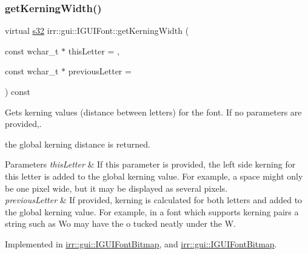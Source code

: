 \subsubsection{\texorpdfstring{get\+Kerning\+Width()}{getKerningWidth()}\hspace{0.1cm}{\footnotesize\ttfamily [1/2]}}
{\footnotesize\ttfamily virtual \hyperlink{namespaceirr_ac66849b7a6ed16e30ebede579f9b47c6}{s32} irr\+::gui\+::\+I\+G\+U\+I\+Font\+::get\+Kerning\+Width (\begin{DoxyParamCaption}\item[{const wchar\+\_\+t $\ast$}]{this\+Letter = {},  }\item[{const wchar\+\_\+t $\ast$}]{previous\+Letter = {} }\end{DoxyParamCaption}) const\hspace{0.3cm}{\ttfamily [pure virtual]}}



Gets kerning values (distance between letters) for the font. If no parameters are provided,. 

the global kerning distance is returned. 
\begin{DoxyParams}{Parameters}
{\em this\+Letter} & If this parameter is provided, the left side kerning for this letter is added to the global kerning value. For example, a space might only be one pixel wide, but it may be displayed as several pixels. \\
\hline
{\em previous\+Letter} & If provided, kerning is calculated for both letters and added to the global kerning value. For example, in a font which supports kerning pairs a string such as \textquotesingle{}Wo\textquotesingle{} may have the \textquotesingle{}o\textquotesingle{} tucked neatly under the \textquotesingle{}W\textquotesingle{}. \\
\hline
\end{DoxyParams}


Implemented in \hyperlink{classirr_1_1gui_1_1IGUIFontBitmap_a7bdeaea45745a10e09f7769ec3b95a12}{irr\+::gui\+::\+I\+G\+U\+I\+Font\+Bitmap}, and \hyperlink{classirr_1_1gui_1_1IGUIFontBitmap_a7bdeaea45745a10e09f7769ec3b95a12}{irr\+::gui\+::\+I\+G\+U\+I\+Font\+Bitmap}.

\mbox{\label{classirr_1_1gui_1_1IGUIFont_a7de0b25d3d1dbdcc9036e5d788e2d9ab}} 
